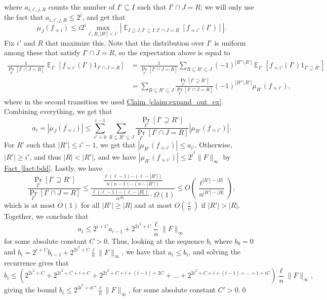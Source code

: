 \documentclass[11pt]{article}
\newcommand{\expref}[2]{\texorpdfstring{\hyperref[#2]{#1~\ref{#2}}}{#1~\ref{#2}}}
\newcommand\card[1]{\left| {#1} \right|}
\newcommand\Prob[2]{{\Pr_{#1}\left[ {#2} \right]}}
\newcommand\Expect[2]{{\mathop{\mathbb{E}}_{#1}\left[ {#2} \right]}}
\newcommand\norm[1]{\| #1 \|}
\renewcommand\geq{\geqslant}
\renewcommand\leq{\leqslant}
\newcommand\approxlvlfn[2]{{#1}_{\approx{#2}}}
\begin{document}
where $a_{i,i',j,R}$ counts the number of $I'\subseteq I$ such that $I'\cap J = R$; we will only use the fact that
$a_{i,i',j,R}\leq 2^i$, and get that
\[
\mu_J(\approxlvlfn{f}{i})
\leq i2^{i}\max_{i',R, \card{R'}<i'}\card{\Expect{I\supseteq J, I'\subseteq I: I'\cap J = R}{\approxlvlfn{f}{i'}(I')}}.
\]
Fix $i'$ and $R$ that maximize this. Note that the distribution over $I'$ is uniform among these that satisfy $I'\cap J = R$, so
the expectation above is equal to
\begin{align*}
\frac{1}{\Prob{I'}{I'\cap J = R}}\Expect{I'}{\approxlvlfn{f}{i'}(I')1_{I'\cap J = R}}
&=\frac{1}{\Prob{I'}{I'\cap J = R}}\sum\limits_{R\subseteq R'\subseteq J}
(-1)^{\card{R''\setminus R'}}\Expect{I'}{\approxlvlfn{f}{i'}(I')1_{I'\supseteq R'}}\\
&=\sum\limits_{R\subseteq R'\subseteq J}
\frac{\Prob{I'}{I'\supseteq R'}}{\Prob{I'}{I'\cap J = R}}
(-1)^{\card{R''\setminus R'}}\mu_{R'}(\approxlvlfn{f}{i'}),
\end{align*}
where in the second transition we used \expref{Claim}{claim:expand_out_ex}. Combining everything, we get that
\[
a_i
=\card{\mu_{J}(\approxlvlfn{f}{i})}
\leq
\sum\limits_{i'=0}^{i-1}\sum\limits_{R\subseteq R'\subseteq J}
\frac{\Prob{I'}{I'\supseteq R'}}{\Prob{I'}{I'\cap J = R}}
\card{\mu_{R'}(\approxlvlfn{f}{i'})}.
\]
For $R'$ such that $\card{R'}\leq i'-1$, we get that $\card{\mu_{R'}(\approxlvlfn{f}{i'})}\leq a_{i'}$.
Otherwise, $\card{R'}\geq i'$, and thus $\card{R}<\card{R'}$, and we have
$\card{\mu_{R'}(\approxlvlfn{f}{i'})}\leq 2^{i^2}\norm{F}_{\infty}$ by \expref{Fact}{fact:bdd}. Lastly, we have
\[
\frac{\Prob{I'}{I'\supseteq R'}}{\Prob{I'}{I'\cap J = R}}
\leq
\frac{\frac{\ell(\ell-1)\cdots(\ell-\card{R'})}{n(n-1)\cdots(n-\card{R'})}}{\frac{\ell(\ell-1)\cdots(\ell-\card{R})}{n^{\card{R}}} \cdot \Omega(1)}
\leq O\left(\frac{\ell^{\card{R'}-\card{R}}}{n^{\card{R'}-\card{R}}}\right),
\]
which is at most $O(1)$ for all $\card{R'}\geq \card{R}$ and at most $O\left(\frac{\ell}{n}\right)$ if $\card{R'}>\card{R}$.
Together, we conclude that
\[
a_i\leq 2^{i+C} a_{i-1} + 2^{2i^2+C} \frac{\ell}{n}\norm{F}_{\infty}
\]
for some absolute constant $C>0$. Thus, looking at the sequence $b_i$ where $b_0 = 0$
and $b_{i} = 2^{i+C}  b_{i-1} + 2^{2i^2+C} \frac{\ell}{n}\norm{F}_{\infty}$, we have that $a_i\leq b_i$,
and solving the recurrence gives that
\[
b_{i}\leq \left(2^{2i^2+C} + 2^{2i^2+C+i+C} + 2^{2i^2+C+i+(i-1)+2C}+\ldots + 2^{2i^2+C+i+(i-1)+\ldots+1+iC}\right)\frac{\ell}{n}\norm{F}_{\infty},
\]
giving the bound $b_i\leq 2^{3i^2 + iC'} \frac{\ell}{n}\norm{F}_{\infty}$, for some absolute constant $C'>0$.\qed
\end{document}
